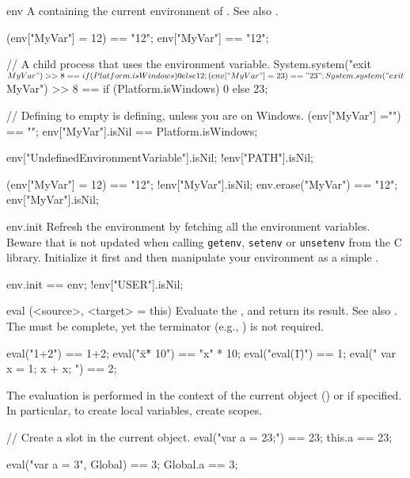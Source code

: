 \begin{urbiscriptapi}
\item[env]
  A  containing the current
  environment of \urbi.  See also .
\begin{urbiassert}
(env["MyVar"] = 12) == "12";
env["MyVar"] == "12";

// A child process that uses the environment variable.
System.system("exit $MyVar") >> 8 ==
       {if (Platform.isWindows) 0 else 12};
(env["MyVar"] = 23) == "23";
System.system("exit $MyVar") >> 8 ==
       {if (Platform.isWindows) 0 else 23};

// Defining to empty is defining, unless you are on Windows.
(env["MyVar"] ="") == "";
env["MyVar"].isNil == Platform.isWindows;

env["UndefinedEnvironmentVariable"].isNil;
!env["PATH"].isNil;

(env["MyVar"] = 12) == "12";
!env["MyVar"].isNil;
env.erase("MyVar") == "12";
env["MyVar"].isNil;
\end{urbiassert}


\item[env.init]%
  Refresh the \urbi environment by fetching all the environment variables.
  Beware that  is not updated when calling \lstinline{getenv},
  \lstinline{setenv} or \lstinline{unsetenv} from the C library.  Initialize
  it first and then manipulate your environment as a simple
  .
\begin{urbiassert}
env.init == env;
!env["USER"].isNil;
\end{urbiassert}


\item[eval](<source>, <target> = this)%
  Evaluate the \us {}, and return its result.  See also
  .  The  must be complete, yet the terminator
  (e.g., \samp{;}) is not required.
\begin{urbiassert}
eval("1+2") == 1+2;
eval("\"x\" * 10") == "x" * 10;
eval("eval(\"1\")") == 1;
eval("{ var x = 1; x + x; }") == 2;
\end{urbiassert}

The evaluation is performed in the context of the current object (\this) or
 if specified.  In particular, to create local variables, create
scopes.
\begin{urbiassert}
// Create a slot in the current object.
eval("var a = 23;") == 23;
this.a == 23;

eval("var a = 3", Global) == 3;
Global.a == 3;
\end{urbiassert}


\end{urbiscriptapi}
